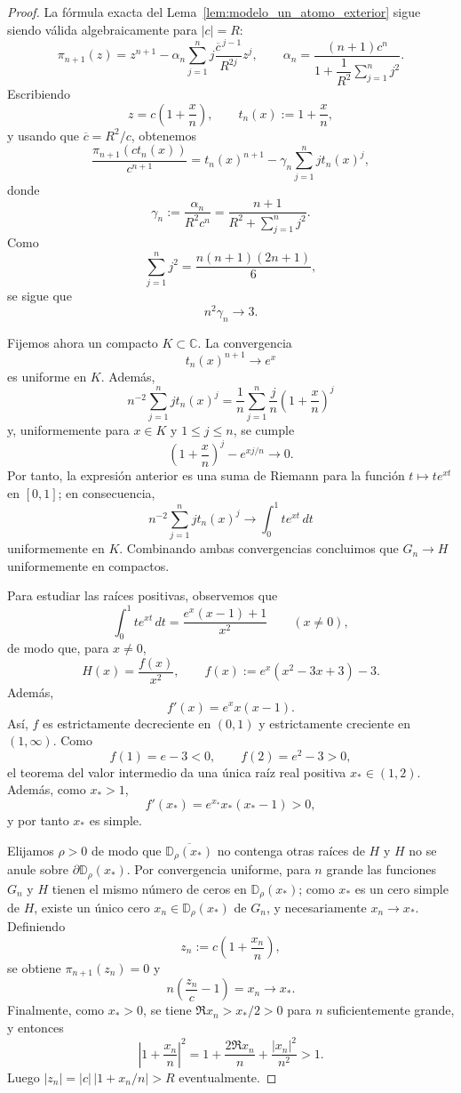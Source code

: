 \begin{proof}
	La fórmula exacta del Lema~\ref{lem:modelo_un_atomo_exterior} sigue siendo válida algebraicamente para $|c|=R$:
	\[
		\pi_{n+1}(z)=z^{n+1}-\alpha_n\sum_{j=1}^n j\frac{\overline c^{\,j-1}}{R^{2j}}z^j,
		\qquad
		\alpha_n=
		\frac{(n+1)c^n}{1+\dfrac1{R^2}\sum_{j=1}^n j^2}.
	\]
	Escribiendo
	\[
		z=c\left(1+\frac{x}{n}\right),
		\qquad
		t_n(x):=1+\frac{x}{n},
	\]
	y usando que $\overline c=R^2/c$, obtenemos
	\[
		\frac{\pi_{n+1}(c t_n(x))}{c^{n+1}}
		=
		t_n(x)^{n+1}-\gamma_n\sum_{j=1}^n j t_n(x)^j,
	\]
	donde
	\[
		\gamma_n:=\frac{\alpha_n}{R^2c^n}=
		\frac{n+1}{R^2+\sum_{j=1}^n j^2}.
	\]
	Como
	\[
		\sum_{j=1}^n j^2=\frac{n(n+1)(2n+1)}{6},
	\]
	se sigue que
	\[
		n^2\gamma_n\longrightarrow 3.
	\]

	Fijemos ahora un compacto $K\subset\mathbb C$. La convergencia
	\[
		t_n(x)^{n+1}\longrightarrow e^x
	\]
	es uniforme en $K$. Además,
	\[
		n^{-2}\sum_{j=1}^n j t_n(x)^j
		=
		\frac1n\sum_{j=1}^n \frac{j}{n}\left(1+\frac{x}{n}\right)^j
	\]
	y, uniformemente para $x\in K$ y $1\le j\le n$, se cumple
	\[
		\left(1+\frac{x}{n}\right)^j-e^{xj/n}\longrightarrow 0.
	\]
	Por tanto, la expresión anterior es una suma de Riemann para la función $t\mapsto t e^{xt}$ en $[0,1]$; en consecuencia,
	\[
		n^{-2}\sum_{j=1}^n j t_n(x)^j
		\longrightarrow
		\int_0^1 t e^{xt}\,dt
	\]
	uniformemente en $K$. Combinando ambas convergencias concluimos que $G_n\to H$ uniformemente en compactos.

	Para estudiar las raíces positivas, observemos que
	\[
		\int_0^1 t e^{xt}\,dt=
		\frac{e^x(x-1)+1}{x^2}
		\qquad (x\neq 0),
	\]
	de modo que, para $x\neq 0$,
	\[
		H(x)=\frac{f(x)}{x^2},
		\qquad
		f(x):=e^x(x^2-3x+3)-3.
	\]
	Además,
	\[
		f'(x)=e^x x(x-1).
	\]
	Así, $f$ es estrictamente decreciente en $(0,1)$ y estrictamente creciente en $(1,\infty)$. Como
	\[
		f(1)=e-3<0,
		\qquad
		f(2)=e^2-3>0,
	\]
	el teorema del valor intermedio da una única raíz real positiva $x_*\in(1,2)$. Además, como $x_*>1$,
	\[
		f'(x_*)=e^{x_*}x_*(x_*-1)>0,
	\]
	y por tanto $x_*$ es simple.

	Elijamos $\rho>0$ de modo que $\overline{\mathbb D_\rho(x_*)}$ no contenga otras raíces de $H$ y $H$ no se anule sobre $\partial\mathbb D_\rho(x_*)$. Por convergencia uniforme, para $n$ grande las funciones $G_n$ y $H$ tienen el mismo número de ceros en $\mathbb D_\rho(x_*)$; como $x_*$ es un cero simple de $H$, existe un único cero $x_n\in\mathbb D_\rho(x_*)$ de $G_n$, y necesariamente $x_n\to x_*$. Definiendo
	\[
		z_n:=c\left(1+\frac{x_n}{n}\right),
	\]
	se obtiene $\pi_{n+1}(z_n)=0$ y
	\[
		n\left(\frac{z_n}{c}-1\right)=x_n\longrightarrow x_*.
	\]
	Finalmente, como $x_*>0$, se tiene $\Re x_n>x_*/2>0$ para $n$ suficientemente grande, y entonces
	\[
		\left|1+\frac{x_n}{n}\right|^2
		=
		1+\frac{2\Re x_n}{n}+\frac{|x_n|^2}{n^2}>1.
	\]
	Luego $|z_n|=|c|\,\bigl|1+x_n/n\bigr|>R$ eventualmente.
\end{proof}

